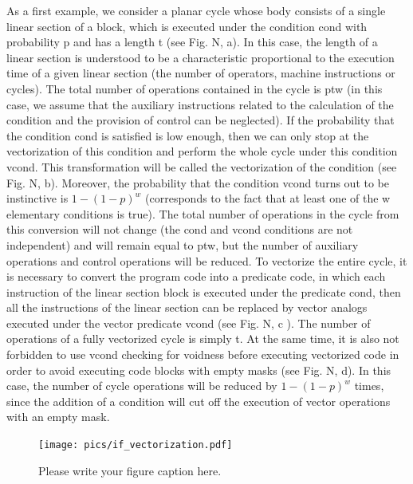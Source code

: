 \documentclass[
11pt,%
tightenlines,%
twoside,%
onecolumn,%
nofloats,%
nobibnotes,%
nofootinbib,%
superscriptaddress,%
noshowpacs,%
centertags]%
{revtex4}
\begin{document}
As a first example, we consider a planar cycle whose body consists of a single linear section of a block, which is executed under the condition cond with probability p and has a length t (see Fig. N, a). In this case, the length of a linear section is understood to be a characteristic proportional to the execution time of a given linear section (the number of operators, machine instructions or cycles). The total number of operations contained in the cycle is ptw (in this case, we assume that the auxiliary instructions related to the calculation of the condition and the provision of control can be neglected). If the probability that the condition cond is satisfied is low enough, then we can only stop at the vectorization of this condition and perform the whole cycle under this condition vcond. This transformation will be called the vectorization of the condition (see Fig. N, b). Moreover, the probability that the condition vcond turns out to be instinctive is $1 - (1 - p) ^ w$ (corresponds to the fact that at least one of the w elementary conditions is true). The total number of operations in the cycle from this conversion will not change (the cond and vcond conditions are not independent) and will remain equal to ptw, but the number of auxiliary operations and control operations will be reduced. To vectorize the entire cycle, it is necessary to convert the program code into a predicate code, in which each instruction of the linear section block is executed under the predicate cond, then all the instructions of the linear section can be replaced by vector analogs executed under the vector predicate vcond (see Fig. N, c ). The number of operations of a fully vectorized cycle is simply t. At the same time, it is also not forbidden to use vcond checking for voidness before executing vectorized code in order to avoid executing code blocks with empty masks (see Fig. N, d). In this case, the number of cycle operations will be reduced by $1 - (1 - p) ^ w$ times, since the addition of a condition will cut off the execution of vector operations with an empty mask.

\begin{figure}[h]
\setcaptionmargin{5mm}
\onelinecaptionstrue  %
\texttt{[image: pics/if\_vectorization.pdf]}
\caption{Please write your figure caption here.}\label{fig:1}
\end{figure}
\end{document}
